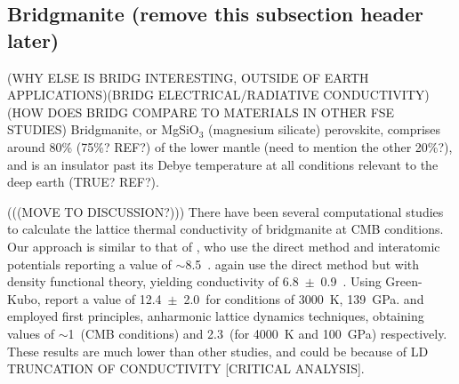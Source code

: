 \documentclass[%
preprint,                                  %
nofootinbib,
 amsmath,amssymb,
 aps,
]{revtex4-1}
\begin{document}
\subsection{\label{sec:intro.brdg}Bridgmanite (remove this subsection header later)}

(WHY ELSE IS BRIDG INTERESTING, OUTSIDE OF EARTH APPLICATIONS)(BRIDG ELECTRICAL/RADIATIVE CONDUCTIVITY)(HOW DOES BRIDG COMPARE TO MATERIALS IN OTHER FSE STUDIES)
Bridgmanite, or MgSiO$_3$ (magnesium silicate) perovskite, comprises around 80\% (75\%? REF?) of the lower mantle (need to mention the other 20\%?), and is an insulator past its Debye temperature at all conditions relevant to the deep earth (TRUE? REF?). 

(((MOVE TO DISCUSSION?)))
There have been several computational studies to calculate the lattice thermal conductivity of bridgmanite at CMB conditions.  
Our approach is similar to that of \citet{Ammann2014}, who use the direct method and interatomic potentials reporting a value of $\sim$8.5~\wmk. \citet{Stackhouse2015} again use the direct method but with density functional theory, yielding conductivity of 6.8~$\pm$~0.9~\wmk. Using Green-Kubo, \citet{Haigis2013} report a value of 12.4~$\pm$~2.0~\wmk for conditions of 3000~K, 139~GPa. \citet{Tang2014} and \citet{Dekura2013} employed first principles, anharmonic lattice dynamics techniques, obtaining values of $\sim$1~\wmk (CMB conditions) and 2.3~\wmk (for 4000~K and 100~GPa) respectively. These results are much lower than other studies, and could be because of LD TRUNCATION OF CONDUCTIVITY [CRITICAL ANALYSIS].









\end{document}
